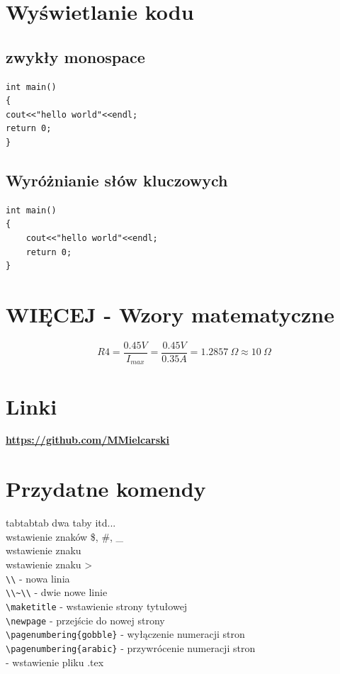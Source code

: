 \documentclass{article}
\begin{document}
\section{Wyświetlanie kodu}
\subsection{zwykły monospace}
\lstset{tabsize=1}
\begin{lstlisting}
int main()
{
cout<<"hello world"<<endl;
return 0;
}
\end{lstlisting}
\subsection{Wyróżnianie słów kluczowych}
\begin{verbatim}
int main()
{
	cout<<"hello world"<<endl;
	return 0;
}
\end{verbatim}

\section{WIĘCEJ - Wzory matematyczne}

\[  
	 R4 = \frac{0.45V}{I_{max}}=\frac{0.45V}{0.35A}=1.2857~\Omega \approx 10~\Omega
\]

\section{Linki}
\href{https://github.com/MMielcarski}{\large\textbf{https://github.com/MMielcarski}}

\section{Przydatne komendy}
tab\quad tab\quad tab \qquad dwa taby \quad\quad\quad\quad itd... \\
wstawienie znaków \$, \#, \_ \\
wstawienie znaku \textbar \\
wstawienie znaku \textgreater \\ 	
\verb$\\$ - nowa linia \\
\verb$\\~\\$ - dwie nowe linie \\
\verb$\maketitle$ - wstawienie strony tytułowej \\
\verb$\newpage$ - przejście do nowej strony \\
\verb$\pagenumbering{gobble}$ - wyłączenie numeracji stron \\
\verb$\pagenumbering{arabic}$ - przywrócenie numeracji stron \\
\verb$$ - wstawienie pliku .tex \\
\end{document}
